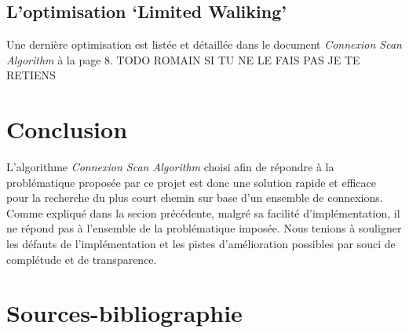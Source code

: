 \documentclass[12pt]{article}
\begin{document}
\subsection{L'optimisation `Limited Waliking'}
Une dernière optimisation est listée et détaillée dans le document \emph{Connexion Scan Algorithm} \cite{dibbelt2017connection} à la page 8. TODO ROMAIN SI TU NE LE FAIS PAS JE TE RETIENS

\section{Conclusion}
L'algorithme \emph{Connexion Scan Algorithm} choisi afin de répondre à la problématique proposée par ce projet est donc une solution rapide et efficace pour la recherche du plus court chemin
sur base d'un ensemble de connexions. Comme expliqué dans la secion précédente, malgré sa facilité d'implémentation, il ne répond pas à l'ensemble de la problématique imposée. Nous
tenions à souligner les défauts de l'implémentation et les pistes d'amélioration possibles par souci de complétude et de transparence.


\section{Sources-bibliographie}
\printbibliography
\end{document}
